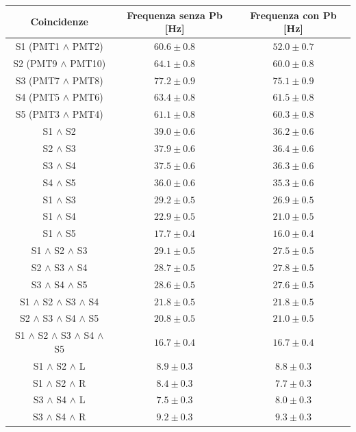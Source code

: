 \documentclass[10pt, oneside, a4paper]{article}   	%
\begin{document}
\begin{table}[H]
	\centering
	\begin{tabular}{ccc}
		\toprule
		Coincidenze						&	Frequenza senza Pb [Hz] & Frequenza con Pb [Hz]	\\
		\midrule
		S1 (PMT1 $\wedge$ PMT2)					& $60.6 \pm 0.8$	& $52.0 \pm 0.7$ \\
		S2 (PMT9 $\wedge$ PMT10)				& $64.1 \pm 0.8$	& $60.0 \pm 0.8$ \\
		S3 (PMT7 $\wedge$ PMT8)					& $77.2 \pm 0.9$	& $75.1 \pm 0.9$ \\
		S4 (PMT5 $\wedge$ PMT6)					& $63.4 \pm 0.8$	& $61.5 \pm 0.8$ \\
		S5 (PMT3 $\wedge$ PMT4)					& $61.1 \pm 0.8$	& $60.3 \pm 0.8$ \\
		S1 $\wedge$ S2 						& $39.0 \pm 0.6$	& $36.2 \pm 0.6$ \\
		S2 $\wedge$ S3 						& $37.9 \pm 0.6$    	& $36.4 \pm 0.6$ \\
		S3 $\wedge$ S4 						& $37.5 \pm 0.6$	& $36.3 \pm 0.6$ \\
		S4 $\wedge$ S5 						& $36.0 \pm 0.6$	& $35.3 \pm 0.6$ \\
		S1 $\wedge$ S3 						& $29.2 \pm 0.5$	& $26.9 \pm 0.5$ \\
		S1 $\wedge$ S4 						& $22.9 \pm 0.5$	& $21.0 \pm 0.5$ \\
		S1 $\wedge$ S5 						& $17.7 \pm 0.4$	& $16.0 \pm 0.4$ \\
		S1 $\wedge$ S2 $\wedge$ S3				& $29.1 \pm 0.5$	& $27.5 \pm 0.5$ \\
		S2 $\wedge$ S3 $\wedge$ S4				& $28.7 \pm 0.5$	& $27.8 \pm 0.5$ \\
		S3 $\wedge$ S4 $\wedge$ S5				& $28.6 \pm 0.5$	& $27.6 \pm 0.5$ \\
		S1 $\wedge$ S2 $\wedge$ S3 $\wedge$ S4			& $21.8 \pm 0.5$	& $21.8 \pm 0.5$ \\
		S2 $\wedge$ S3 $\wedge$ S4 $\wedge$ S5			& $20.8 \pm 0.5$	& $21.0 \pm 0.5$ \\
		S1 $\wedge$ S2 $\wedge$ S3 $\wedge$ S4 $\wedge$ S5	& $16.7 \pm 0.4$	& $16.7 \pm 0.4$ \\	
		S1 $\wedge$ S2 $\wedge$ L				& $8.9 \pm 0.3$		& $8.8 \pm 0.3$	\\
		S1 $\wedge$ S2 $\wedge$ R				& $8.4 \pm 0.3$		& $7.7 \pm 0.3$	\\
		S3 $\wedge$ S4 $\wedge$ L				& $7.5 \pm 0.3$		& $8.0 \pm 0.3$	\\
		S3 $\wedge$ S4 $\wedge$ R				& $9.2 \pm 0.3$ 	& $9.3 \pm 0.3$	\\

\end{tabular}
\end{table}
\end{document}
